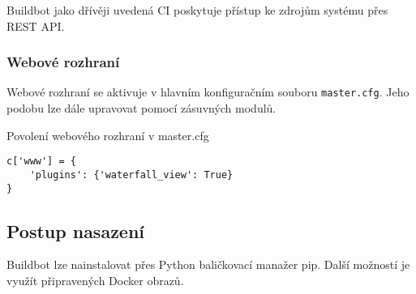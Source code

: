 Buildbot jako dřívěji uvedená CI poskytuje přístup ke zdrojům systému přes REST API.

\subsubsection{Webové rozhraní}

Webové rozhraní se aktivuje v hlavním konfiguračním souboru \verb|master.cfg|.
Jeho podobu lze dále upravovat pomocí zásuvných modulů.

\begin{listing}[ht]
\caption{\label{code:buildbot-enable-web}Povolení webového rozhraní v master.cfg}
\begin{verbatim}
c['www'] = {
    'plugins': {'waterfall_view': True}
}
\end{verbatim}
\end{listing}


\subsection{Postup nasazení}

Buildbot lze nainstalovat přes Python baličkovací manažer pip.
Další možností je využít připravených Docker obrazů.